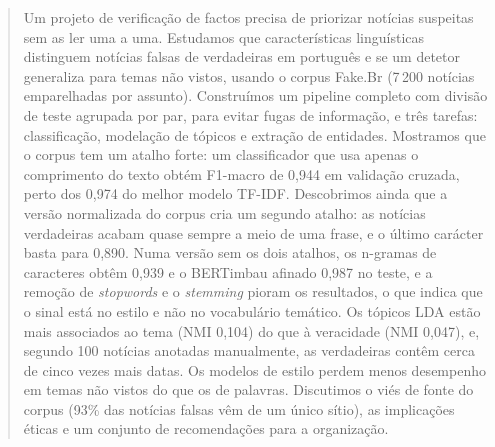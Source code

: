 \begin{abstract}
Um projeto de verificação de factos precisa de priorizar notícias suspeitas sem as ler uma a uma.
Estudamos que características linguísticas distinguem notícias falsas de verdadeiras em português
e se um detetor generaliza para temas não vistos, usando o corpus Fake.Br (7\,200 notícias
emparelhadas por assunto). Construímos um pipeline completo com divisão de teste agrupada por par,
para evitar fugas de informação, e três tarefas: classificação, modelação de tópicos e extração de
entidades. Mostramos que o corpus tem um atalho forte: um classificador que usa apenas o comprimento
do texto obtém F1-macro de 0,944 em validação cruzada, perto dos 0,974 do melhor modelo TF-IDF.
Descobrimos ainda que a versão normalizada do corpus cria um segundo atalho: as notícias
verdadeiras acabam quase sempre a meio de uma frase, e o último carácter basta para 0,890. Numa versão
sem os dois atalhos, os n-gramas de caracteres obtêm 0,939 e o BERTimbau afinado 0,987 no teste, e a remoção
de \emph{stopwords} e o \emph{stemming} pioram os resultados, o que indica que o sinal está no
estilo e não no vocabulário temático. Os tópicos LDA estão mais associados
ao tema (NMI 0,104) do que à veracidade (NMI 0,047), e, segundo 100 notícias anotadas manualmente, as verdadeiras
contêm cerca de cinco vezes mais datas. Os modelos de estilo perdem menos desempenho em temas não vistos
do que os de palavras. Discutimos o viés de fonte do corpus (93\% das notícias falsas vêm de um
único sítio), as implicações éticas e um conjunto de recomendações para a organização.
\end{abstract}
